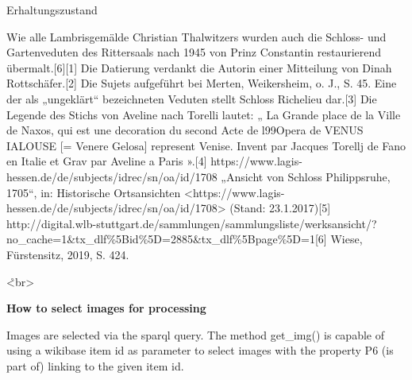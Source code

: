 \documentclass[
  a4paper,
]{book}
\begin{document}
Erhaltungszustand

Wie alle Lambrisgemälde Christian Thalwitzers wurden auch die Schloss-
und Gartenveduten des Rittersaals nach 1945 von Prinz Constantin
restaurierend übermalt.{[}6{]}{[}1{]} Die Datierung verdankt die Autorin
einer Mitteilung von Dinah Rottschäfer.{[}2{]} Die Sujets aufgeführt bei
Merten, Weikersheim, o. J., S. 45. Eine der als
„ungeklärt`` bezeichneten Veduten stellt Schloss Richelieu dar.{[}3{]}
Die Legende des Stichs von Aveline nach Torelli lautet: „ La Grande
place de la Ville de Naxos, qui est une decoration du second Acte de
l\x99Opera de VENUS IALOUSE {[}= Venere Gelosa{]}
represent  Venise. Invent par Jacques Torellj de
Fano en Italie et Grav par Aveline a Paris ».{[}4{]}
https://www.lagis-hessen.de/de/subjects/idrec/sn/oa/id/1708 „Ansicht von
Schloss Philippsruhe, 1705``, in: Historische Ortsansichten
\textless https://www.lagis-hessen.de/de/subjects/idrec/sn/oa/id/1708\textgreater{}
(Stand: 23.1.2017){[}5{]}
http://digital.wlb-stuttgart.de/sammlungen/sammlungsliste/werksansicht/?no\_cache=1\&tx\_dlf\%5Bid\%5D=2885\&tx\_dlf\%5Bpage\%5D=1{[}6{]}
Wiese, Fürstensitz, 2019, S. 424.

\r<br\textgreater{}

\textbf{How to select images for processing}

Images are selected via the sparql query. The method get\_img() is
capable of using a wikibase item id as parameter to select images with
the property P6 (is part of) linking to the given item id.
\end{document}
